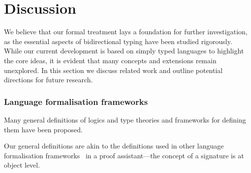 
\section{Discussion} \label{sec:future}
We believe that our formal treatment lays a foundation for further investigation, as the essential aspects of bidirectional typing have been studied rigorously. 
While our current development is based on simply typed languages to highlight the core ideas, it is evident that many concepts and extensions remain unexplored.
In this section we discuss related work and outline potential directions for future research.
\subsubsection{Language formalisation frameworks}
Many general definitions of logics and type theories and frameworks for defining them have been proposed.

\citet{Harper1993a,Harper2007}
\cite{Uemura2021}
\cite{Bauer2020,Haselwarter2021,Bauer2022a}
Our general definitions are akin to the definitions used in other language formalisation frameworks~\citep{Ahrens2022,Allais2021,Fiore2022} in a proof assistant---the concept of a signature is at object level.

